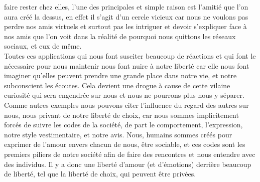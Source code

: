 \documentclass[twocolumn, french]{article}
\begin{document}
faire rester chez elles, l'une des principales et simple raison est l'amitié que l'on aura créé 
la dessus, en effet il s'agit d'un cercle vicieux car nous ne voulons pas perdre nos amis virtuels 
et surtout pas les intriguer et devoir s'expliquer face à nos amis que l'on voit dans la réalité de 
pourquoi nous quittons les réseaux sociaux, et eux de même. \\
Toutes ces applications qui nous font susciter beaucoup de réactions et qui font le nécessaire 
pour nous maintenir nous font nuire à notre liberté car elle nous font imaginer qu'elles peuvent 
prendre une grande place dans notre vie, et notre subconscient les écoutes. Cela devient une drogue
à cause de cette vilaine curiosité qui sera engendrée sur nous et nous ne pourrons plus nous y
séparer. \\
Comme autres exemples nous pouvons citer l'influence du regard des autres sur nous, nous privant de 
notre liberté de choix, car nous sommes implicitement forcés de suivre les codes de la société, de part
le comportement, l'expression, notre style vestimentaire, et notre avis. Nous, humains sommes créés pour
exprimer de l'amour envers chacun de nous, être sociable, et ces codes sont les premiers piliers de notre
société afin de faire des rencontres et nous entendre avec des individus. Il y a donc une liberté d'amour 
(et d'émotions) derrière beaucoup de liberté, tel que la liberté de choix, qui peuvent être privées.
\end{document}
